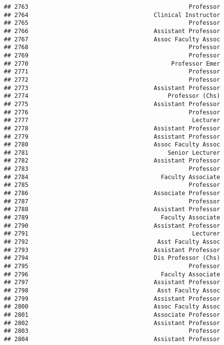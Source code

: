 \documentclass[
]{article}
\begin{document}
\begin{verbatim}
## 2763                                              Professor
## 2764                                    Clinical Instructor
## 2765                                              Professor
## 2766                                    Assistant Professor
## 2767                                    Assoc Faculty Assoc
## 2768                                              Professor
## 2769                                              Professor
## 2770                                         Professor Emer
## 2771                                              Professor
## 2772                                              Professor
## 2773                                    Assistant Professor
## 2774                                        Professor (Chs)
## 2775                                    Assistant Professor
## 2776                                              Professor
## 2777                                               Lecturer
## 2778                                    Assistant Professor
## 2779                                    Assistant Professor
## 2780                                    Assoc Faculty Assoc
## 2781                                        Senior Lecturer
## 2782                                    Assistant Professor
## 2783                                              Professor
## 2784                                      Faculty Associate
## 2785                                              Professor
## 2786                                    Associate Professor
## 2787                                              Professor
## 2788                                    Assistant Professor
## 2789                                      Faculty Associate
## 2790                                    Assistant Professor
## 2791                                               Lecturer
## 2792                                     Asst Faculty Assoc
## 2793                                    Assistant Professor
## 2794                                    Dis Professor (Chs)
## 2795                                              Professor
## 2796                                      Faculty Associate
## 2797                                    Assistant Professor
## 2798                                     Asst Faculty Assoc
## 2799                                    Assistant Professor
## 2800                                    Assoc Faculty Assoc
## 2801                                    Associate Professor
## 2802                                    Assistant Professor
## 2803                                              Professor
## 2804                                    Assistant Professor

\end{verbatim}
\end{document}
